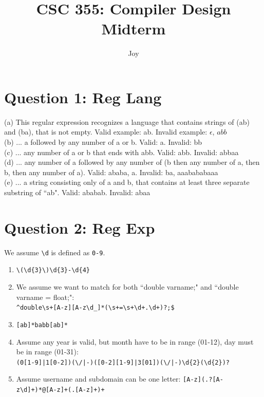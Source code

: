 \documentclass{article}
\title{CSC 355: Compiler Design Midterm}
\author{Joy}
\begin{document}
\maketitle
\pagebreak
\noindent
\section*{Question 1: Reg Lang}
(a) This regular expression recognizes a language that contains strings of (ab) and (ba), that is not empty. Valid example: ab. Invalid example: $\epsilon$, $abb$
\\
(b) ... a followed by any number of a or b. Valid: a. Invalid: bb
\\
(c) ... any number of a or b that ends with abb. Valid: abb. Invalid: abbaa
\\
(d) ... any number of a followed by any number of (b then any number of a, then b, then any number of a). Valid: ababa, a. Invalid: ba, aaabababaaa
\\
(e) ... a string consisting only of a and b, that contains at least three separate substring of ``ab". Valid: ababab. Invalid: abaa
\section*{Question 2: Reg Exp}
We assume \verb|\d| is defined as \verb|0-9|.
\begin{enumerate}
  \item \verb|\(\d{3}\)\d{3}-\d{4}|
  \item We assume we want to match for both ``double varname;" and ``double varname = float;":\\ \verb|^double\s+[A-z][A-z\d_]*(\s+=\s+\d+.\d+)?;$|
  \item \verb|[ab]*babb[ab]*|
  \item Assume any year is valid, but month have to be in range (01-12), day must be in range (01-31): \\\verb!(0[1-9]|1[0-2])(\/|-)([0-2][1-9]|3[01])(\/|-)\d{2}(\d{2})?!
  \item Assume username and subdomain can be one letter: \verb|[A-z](.?[A-z\d]+)*@[A-z]+(.[A-z]+)+|
\end{enumerate}
\end{document}
